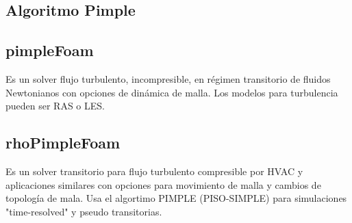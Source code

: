 \subsection{Algoritmo Pimple}


\subsection{pimpleFoam}
Es un solver flujo turbulento, incompresible, en régimen transitorio de fluidos
Newtonianos con opciones de dinámica de malla. Los modelos para turbulencia pueden
ser RAS o LES.



\subsection{rhoPimpleFoam}
Es un solver transitorio para flujo turbulento compresible por HVAC y
aplicaciones similares con opciones para movimiento de malla y cambios de
topología de mala. Usa el algortimo PIMPLE (PISO-SIMPLE) para simulaciones
"time-resolved" y pseudo transitorias.

